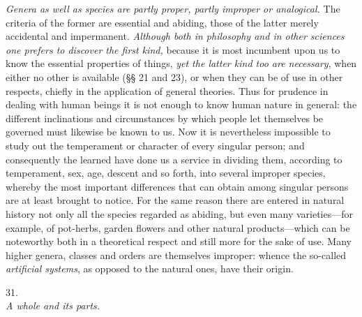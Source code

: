 \documentclass[12pt,a4paper]{article}
\newcommand{\logsec}[2]{%
  \bigskip\begin{center}{\large #1}\\[4pt]{\emph{#2}}\end{center}\smallskip}
\begin{document}
\noindent
\emph{Genera as well as species are partly proper, partly improper or
analogical.} The criteria of the former are essential and abiding, those of the
latter merely accidental and impermanent. \emph{Although both in philosophy and
in other sciences one prefers to discover the first kind,} because it is most
incumbent upon us to know the essential properties of things, \emph{yet the
latter kind too are necessary}, when either
no other is available (§§ 21 and 23), or when they can be of use in other
respects, chiefly in the application of general theories. Thus for prudence in
dealing with human beings it is not enough to know human nature in general: the
different inclinations and circumstances by which people let themselves be
governed must likewise be known to us. Now it is nevertheless impossible to
study out the temperament or character of every singular person; and
consequently the learned have done us a service in dividing them, according to
temperament, sex, age, descent and so forth, into several improper species,
whereby the most important differences that can obtain among singular persons
are at least brought to notice. For the same reason there are entered in natural
history not only all the species regarded as abiding, but even many
varieties---for example, of pot-herbs, garden flowers and other natural
products---which can be noteworthy both in a theoretical respect and still more
for the sake of use. Many higher genera, classes and orders are themselves
improper: whence the so-called \emph{artificial systems}, as opposed to the
natural ones, have their origin.

\logsec{31.}{A whole and its parts.}
\end{document}
